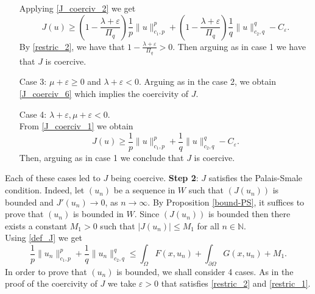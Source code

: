 \documentclass[pdflatex,sn-mathphys-num]{sn-jnl}
\theoremstyle{thmstyleone}%
\theoremstyle{thmstyletwo}%
\theoremstyle{thmstylethree}%
\theoremstyle{thmstylethree}%
\begin{document}
\begin{itemize}
Applying \eqref{J_coerciv_2} we get  \begin{equation}\label{J_coerciv_6}
   J(u)\geqslant  \left( 1- \frac{\lambda+\varepsilon}{ {\Pi}_q}\right)\frac{1}p\|u\|_{c_1,p}^p+\left( 1- \frac{\lambda+\varepsilon}{ {\Pi}_q}\right)\frac{1}{q}\|u\|_{c_2,q}^q-C_\varepsilon .
\end{equation}
 By \eqref{restric_2}, we have that $ 1- \frac{\lambda+\varepsilon}{ {\Pi}_q}>0$. Then arguing as in case 1 we have that $J$ is coercive. 
 \item[Case 3:]
 $\mu +\varepsilon \geqslant 0$ and $\lambda +\varepsilon <0$. Arguing as in the case 2, we obtain \eqref{J_coerciv_6} which implies the coercivity of $J$.\\ 
\item[Case 4:]  $\lambda+\varepsilon, \mu+\varepsilon < 0$.\\ 
From \eqref{J_coerciv_1} we obtain
 \begin{equation*}
     J(u) \geqslant \frac{1}{p}\|u\|_{c_1,p}^p+\frac{1}{q}\|u\|_{c_2,q}^q  -C_\varepsilon.
 \end{equation*}
 Then, arguing as in case 1 we conclude that $J$  is coercive. 
    \end{itemize}
Each of these cases led to   $J$ being  coercive.
\vskip0.2cm
\noindent
\textbf{Step 2}:  $J$ satisfies the Palais-Smale condition.
Indeed, let $(u_n)$ be a sequence in $W$   such that $(J(u_n))$  is bounded and $ J' (u_n) \to 0$, as $n\to \infty$.  By Proposition \ref{bound-PS}, it suffices to prove that $(u_n)$ is bounded in $W$. Since $(J(u_n))$  is bounded then there exists a constant $M_1>0$ such that $|J(u_n)|\leqslant M_1$  for all $n\in \mathbb{N}$. 
\\
Using \eqref{def_J} we get
\begin{equation}\label{J_bounded}
     \frac{1}{p}\|u_n\|_{c_1, p}^p+\frac{1}{q}\|u_n\|_{c_2, q}^q\leqslant  \int_\Omega F(x,u_n) +\int_{\partial\Omega} G(x,u_n)  + M_1  .
 \end{equation}
 In order to prove that $(u_n)$ is bounded, we shall consider 4 cases. As in the proof of the coercivity of $J$ we take $\varepsilon >0$  that  satisfies \eqref{restric_2} and \eqref{restric_1}. 
\end{document}
